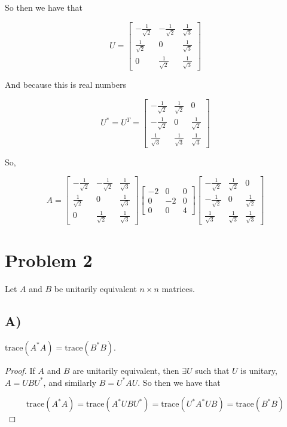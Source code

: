 \documentclass[12pt, letterpaper]{article}
\begin{document}
So then we have that

\[ U = \begin{bmatrix} -\frac{1}{\sqrt{2}} & -\frac{1}{\sqrt{2}} & \frac{1}{\sqrt{3}} \\ \frac{1}{\sqrt{2}} & 0 & \frac{1}{\sqrt{3}} \\ 0 & \frac{1}{\sqrt{2}} & \frac{1}{\sqrt{3}} \end{bmatrix}  \]

And because this is real numbers

\[ U^* = U^T = \begin{bmatrix} -\frac{1}{\sqrt{2}} & \frac{1}{\sqrt{2}} & 0 \\ -\frac{1}{\sqrt{2}} & 0 & \frac{1}{\sqrt{2}} \\ \frac{1}{\sqrt{3}} & \frac{1}{\sqrt{3}} & \frac{1}{\sqrt{3}} \end{bmatrix} \]

So,

\[ A = \begin{bmatrix} -\frac{1}{\sqrt{2}} & -\frac{1}{\sqrt{2}} & \frac{1}{\sqrt{3}} \\ \frac{1}{\sqrt{2}} & 0 & \frac{1}{\sqrt{3}} \\ 0 & \frac{1}{\sqrt{2}} & \frac{1}{\sqrt{3}} \end{bmatrix} \begin{bmatrix} -2 & 0 & 0 \\ 0 & -2 & 0 \\ 0 & 0 & 4 \end{bmatrix} \begin{bmatrix} -\frac{1}{\sqrt{2}} & \frac{1}{\sqrt{2}} & 0 \\ -\frac{1}{\sqrt{2}} & 0 & \frac{1}{\sqrt{2}} \\ \frac{1}{\sqrt{3}} & \frac{1}{\sqrt{3}} & \frac{1}{\sqrt{3}} \end{bmatrix} \]

\section*{Problem 2}
Let $A$ and $B$ be unitarily equivalent $n \times n$ matrices.

\subsection*{A)}
$\text{trace}(A^*A) = \text{trace}(B^*B)$. 

\begin{proof}
If $A$ and $B$ are unitarily equivalent, then $\exists U$ such that $U$ is unitary, $A = UBU^*$, and similarly $B = U^*AU$. So then we have that

\[ \text{trace}(A^*A) = \text{trace}(A^*UBU^*) = \text{trace}(U^*A^*UB) = \text{trace}(B^*B) \]
\end{proof}
\end{document}
